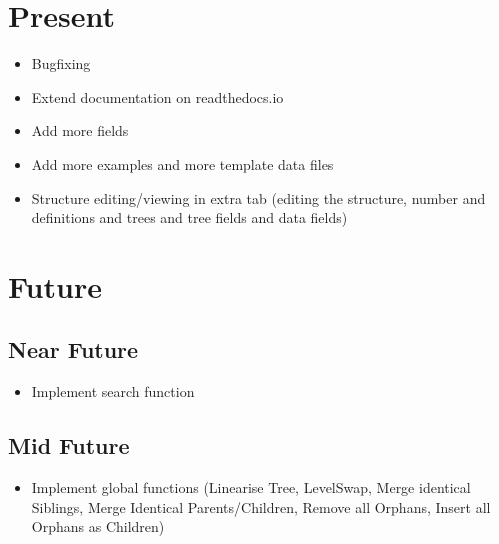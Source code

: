 \documentclass[letterpaper,10pt,english]{sphinxmanual}
\begin{document}
\section{Present}
\label{\detokenize{releases:present}}\begin{itemize}
\item {} 
\sphinxAtStartPar
Bugfixing

\item {} 
\sphinxAtStartPar
Extend documentation on readthedocs.io

\item {} 
\sphinxAtStartPar
Add more fields

\item {} 
\sphinxAtStartPar
Add more examples and more template data files

\item {} 
\sphinxAtStartPar
Structure editing/viewing in extra tab (editing the structure, number and definitions and trees and tree fields and data fields)

\end{itemize}


\section{Future}
\label{\detokenize{releases:future}}

\subsection{Near Future}
\label{\detokenize{releases:near-future}}\begin{itemize}
\item {} 
\sphinxAtStartPar
Implement search function

\end{itemize}


\subsection{Mid Future}
\label{\detokenize{releases:mid-future}}\begin{itemize}
\item {} 
\sphinxAtStartPar
Implement global functions (Linearise Tree, Level\sphinxhyphen{}Swap, Merge identical Siblings, Merge Identical Parents/Children, Remove all Orphans, Insert all Orphans as Children)

\end{itemize}
\end{document}
